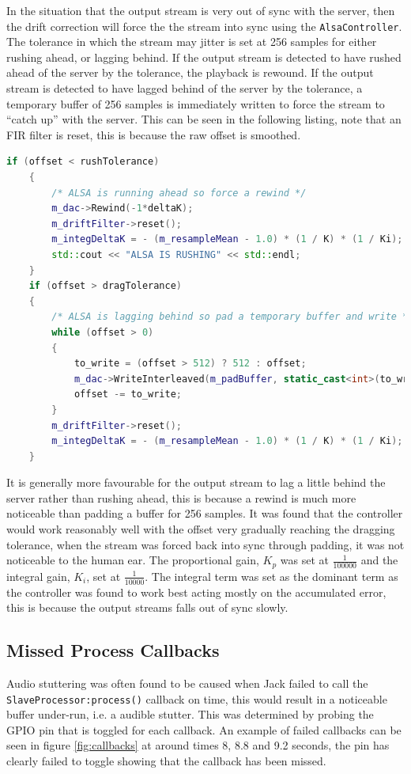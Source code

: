 \documentclass[main.tex]{subfiles}
\begin{document}
In the situation that the output stream is very out of sync with the server, then the drift correction will force the the stream into sync using the \lstinline{AlsaController}.
The tolerance in which the stream may jitter is set at 256 samples for either rushing ahead, or lagging behind.
If the output stream is detected to have rushed ahead of the server by the tolerance, the playback is rewound.
If the output stream is detected to have lagged behind of the server by the tolerance, a temporary buffer of 256 samples is immediately written to force the stream to ``catch up'' with the server. 
This can be seen in the following listing, note that an FIR filter is reset, this is because the raw offset is smoothed. 

\begin{lstlisting}[language=c++, caption={Hard Rewind or Buffer Padding for Unsynchronised Streams}]
    if (offset < rushTolerance)
    {
        /* ALSA is running ahead so force a rewind */
        m_dac->Rewind(-1*deltaK);
        m_driftFilter->reset();
        m_integDeltaK = - (m_resampleMean - 1.0) * (1 / K) * (1 / Ki);
        std::cout << "ALSA IS RUSHING" << std::endl;
    }
    if (offset > dragTolerance)
    {
        /* ALSA is lagging behind so pad a temporary buffer and write */
        while (offset > 0) 
        {
	        to_write = (offset > 512) ? 512 : offset;
            m_dac->WriteInterleaved(m_padBuffer, static_cast<int>(to_write));
	        offset -= to_write;  
	    }
        m_driftFilter->reset();
        m_integDeltaK = - (m_resampleMean - 1.0) * (1 / K) * (1 / Ki);  
    }
\end{lstlisting}
It is generally more favourable for the output stream to lag a little behind the server rather than rushing ahead, this is because a rewind is much more noticeable than padding a buffer for 256 samples.
It was found that the controller would work reasonably well with the offset very gradually reaching the dragging tolerance, when the stream was forced back into sync through padding, it was not noticeable to the human ear.
The proportional gain, $K_p$ was set at $\frac{1}{100000}$ and the integral gain, $K_i$, set at $\frac{1}{10000}$.
The integral term was set as the dominant term as the controller was found to work best acting mostly on the accumulated error, this is because the output streams falls out of sync slowly.

\subsection{Missed Process Callbacks}
Audio stuttering was often found to be caused when Jack failed to call the \lstinline{SlaveProcessor:process()} callback on time, this would result in a noticeable buffer under-run, i.e. a audible stutter.
This was determined by probing the GPIO pin that is toggled for each callback. 
An example of failed callbacks can be seen in figure \ref{fig:callbacks} at around times 8, 8.8 and 9.2 seconds, the pin has clearly failed to toggle showing that the callback has been missed.
\end{document}
